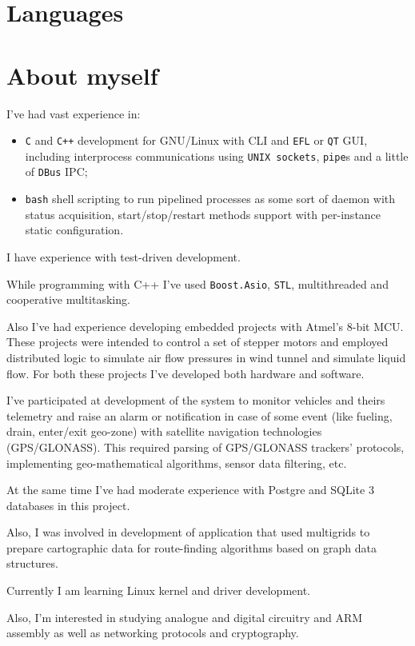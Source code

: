 \documentclass[11pt,a4paper,russian]{moderncv}
\begin{document}
\section{Languages}

\section{About myself}
\par{I've had vast experience in:}
\begin{itemize}
\item \texttt{C} and \texttt{C++} development for GNU/Linux with CLI and \texttt{EFL} or \texttt{QT} GUI, including interprocess communications using \texttt{UNIX sockets}, \texttt{pipe}s and a little of \texttt{DBus} IPC;
\item \texttt{bash} shell scripting to run pipelined processes as some sort of daemon with status acquisition, start/stop/restart methods support with per-instance static configuration.
\end{itemize}
\par{I have experience with test-driven development.}
\par{While programming with C++ I've used \texttt{Boost.Asio}, \texttt{STL}, multithreaded and cooperative multitasking.}
\par{Also I've had experience developing embedded projects with Atmel's 8-bit MCU. These projects were intended to control a set of stepper motors and employed distributed logic to simulate air flow pressures in wind tunnel and simulate liquid flow. For both these projects I've developed both hardware and software.}
\par{I've participated at development of the system to monitor vehicles and theirs telemetry and raise an alarm or notification in case of some event (like fueling, drain, enter/exit geo-zone) with satellite navigation technologies (GPS/GLONASS). This required parsing of GPS/GLONASS trackers' protocols, implementing geo-mathematical algorithms, sensor data filtering, etc.}
\par{At the same time I've had moderate experience with Postgre and SQLite 3 databases in this project.}
\par{Also, I was involved in development of application that used multigrids to prepare cartographic data for route-finding algorithms based on graph data structures.}
\par{Currently I am learning Linux kernel and driver development.}
\par{Also, I'm interested in studying analogue and digital circuitry and ARM assembly as well as networking protocols and cryptography.}

\clearpage
\end{document}
